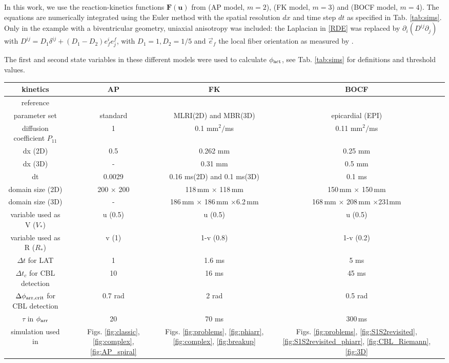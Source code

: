 \documentclass[aps,pre,amsfonts,amssymb,amsmath,twocolumn, superscriptaddress]{revtex4-1}
\newcommand{\phiact}{\ensuremath{\phi_{\rm act}}}
\newcommand{\phiarr}{\ensuremath{\phi_{\rm arr}}}
\newcommand{\VS}{V_*}
\newcommand{\RS}{R_*}
\newcommand{\uu}{\mathbf{u}}
\newcommand{\dd}{\partial}
\begin{document}
In this work, we use the reaction-kinetics functions $\mathbf{F}(\uu)$ from \cite{Aliev:1996} (AP model, $m=2$), \cite{Fenton:1998} (FK model, $m=3$) and \cite{BuenoOrovio:2008} (BOCF model, $m=4$). The equations are numerically integrated using the Euler method with the spatial resolution $dx$ and time step $dt$ as specified in Tab. \ref{tab:sims}. Only in the example with a biventricular geometry, uniaxial anisotropy was included: the Laplacian in \eqref{RDE} was replaced by $\dd_i (D^{ij} \dd_j)$ with $D^{ij} = D_1 \delta^{ij} + (D_1-D_2) e_f^i e^f_j$, with $D_1=1, D_2=1/5$ and $\vec{e}_f$ the local fiber orientation as measured by \cite{Hren:1995}. 

The first and second state variables in these different models were used to calculate $\phiact$, see Tab. \ref{tab:sims} for definitions and threshold values. 

\begin{table*}[b]
    \centering
    \begin{tabular}{c|ccc}
    kinetics & AP & FK & BOCF \\ \hline
    reference & \small{\citep{Aliev:1996}} & \small{\citep{Fenton:1998}} & \tiny{\citep{BuenoOrovio:2008}} \\
    parameter set & standard & MLRI(2D) and MBR(3D) & epicardial (EPI) \\
    diffusion coefficient $P_{11}$ & 1 & 0.1 mm$^2/$ms & 0.11 mm$^2/$ms  \\
    dx (2D) & 0.5  & 0.262 mm & 0.25 mm \\ 
    dx (3D)  & - & 0.31 mm & 0.5 mm \\ 
    dt & 0.0029 & 0.16 ms(2D) and 0.1 ms(3D) & 0.1 ms \\
   domain size (2D) & 200 $\times$ 200 &  118\,mm $\times$ 118\,mm & 150\,mm $\times$ 150\,mm \\
  domain size (3D) & -  & \tiny{186\,mm $\times$ 186\,mm $\times $6.2\,mm} & \tiny{168\,mm $\times$ 208\,mm $\times $231mm} \\
    variable used as V ($\VS$) & u (0.5) & u (0.5) &u (0.5)  \\
    variable used as R ($\RS$) & v (1) & 1-v (0.8) & 1-v (0.2) \\
    $\Delta t$ for LAT & 1 & 1.6 ms & 5 ms\\
    $\Delta t_c$ for CBL detection & 10 & 16 ms & 45 ms\\
    $\Delta\phi_{\rm arr, crit}$ for CBL detection & 0.7 rad & 2 rad  & 0.5 rad \\
   $\tau$ in $\phiarr$& 20 & 70 ms & 300\,ms \\
    simulation used in &  Figs. \ref{fig:classic}, \ref{fig:complex}, \ref{fig:AP_spiral} & Figs. \ref{fig:problems}, \ref{fig:phiarr}, \ref{fig:complex}, \ref{fig:breakup} & Figs. \ref{fig:problems}, \ref{fig:S1S2revisited}, \ref{fig:S1S2revisited_phiarr}, \ref{fig:CBL_Riemann}, \ref{fig:3D} \\ %
    \end{tabular}
    \caption{Overview of mathematical models of cardiac excitation and parameters used in simulations throughout this work. }
    \label{tab:sims}
\end{table*}
\end{document}
